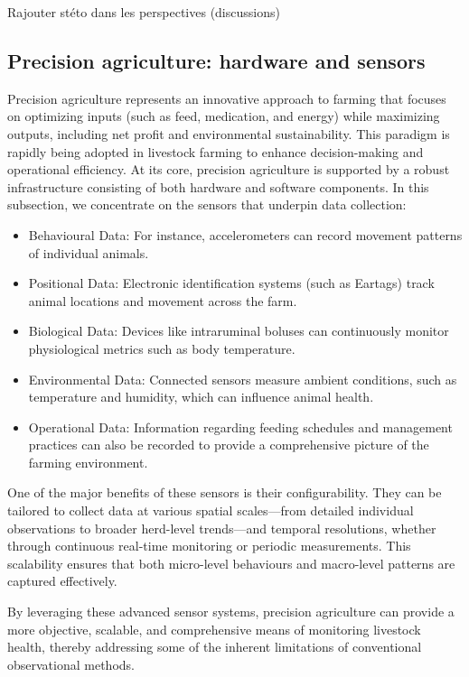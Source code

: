 Rajouter stéto dans les perspectives (discussions)


\subsection{Precision agriculture: hardware and sensors}

Precision agriculture represents an innovative approach to farming that focuses on optimizing inputs (such as feed, medication, and energy) while maximizing outputs, including net profit and environmental sustainability. This paradigm is rapidly being adopted in livestock farming to enhance decision-making and operational efficiency. At its core, precision agriculture is supported by a robust infrastructure consisting of both hardware and software components. In this subsection, we concentrate on the sensors that underpin data collection:


\begin{itemize}
    \item Behavioural Data: For instance, accelerometers can record movement patterns of individual animals.
    \item Positional Data: Electronic identification systems (such as Eartags) track animal locations and movement across the farm.
    \item Biological Data: Devices like intraruminal boluses can continuously monitor physiological metrics such as body temperature.
    \item Environmental Data: Connected sensors measure ambient conditions, such as temperature and humidity, which can influence animal health.
    \item Operational Data: Information regarding feeding schedules and management practices can also be recorded to provide a comprehensive picture of the farming environment.
\end{itemize}

One of the major benefits of these sensors is their configurability. They can be tailored to collect data at various spatial scales—from detailed individual observations to broader herd-level trends—and temporal resolutions, whether through continuous real-time monitoring or periodic measurements. This scalability ensures that both micro-level behaviours and macro-level patterns are captured effectively. 

By leveraging these advanced sensor systems, precision agriculture can provide a more objective, scalable, and comprehensive means of monitoring livestock health, thereby addressing some of the inherent limitations of conventional observational methods.

